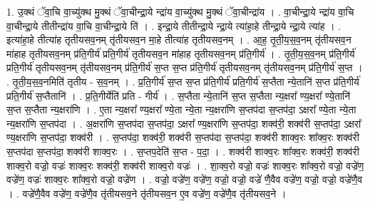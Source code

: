 \documentclass[17pt]{extarticle}
\begin{document}
1. उ॒क्थं ॅवा॒चि वा॒च्यु॑क्थ मु॒क्थं ॅवा॒चीन्द्रा॒ये न्द्रा॑य वा॒च्यु॑क्थ मु॒क्थं ॅवा॒चीन्द्रा॑य । . वा॒चीन्द्रा॒ये न्द्रा॑य वा॒चि वा॒चीन्द्रा॒ये तीतीन्द्रा॑य वा॒चि वा॒चीन्द्रा॒ये ति॑ । . इन्द्रा॒ये तीतीन्द्रा॒ये न्द्रा॒ये त्या॑हा॒हे तीन्द्रा॒ये न्द्रा॒ये त्या॑ह । . इत्या॑हा॒हे तीत्या॑ह तृतीयसव॒नम् तृ॑तीयसव॒न मा॒हे तीत्या॑ह तृतीयसव॒नम् । . आ॒ह॒ तृ॒ती॒य॒स॒व॒नम् तृ॑तीयसव॒न मा॑हाह तृतीयसव॒नम् प्र॑ति॒गीर्य॑ प्रति॒गीर्य॑ तृतीयसव॒न मा॑हाह तृतीयसव॒नम् प्र॑ति॒गीर्य॑ । . तृ॒ती॒य॒स॒व॒नम् प्र॑ति॒गीर्य॑ प्रति॒गीर्य॑ तृतीयसव॒नम् तृ॑तीयसव॒नम् प्र॑ति॒गीर्य॑ स॒प्त स॒प्त प्र॑ति॒गीर्य॑ तृतीयसव॒नम् तृ॑तीयसव॒नम् प्र॑ति॒गीर्य॑ स॒प्त । . तृ॒ती॒य॒स॒व॒नमिति॑ तृतीय - स॒व॒नम् । . प्र॒ति॒गीर्य॑ स॒प्त स॒प्त प्र॑ति॒गीर्य॑ प्रति॒गीर्य॑ स॒प्तैता न्ये॒तानि॑ स॒प्त प्र॑ति॒गीर्य॑ प्रति॒गीर्य॑ स॒प्तैतानि॑ । . प्र॒ति॒गीर्येति॑ प्रति - गीर्य॑ । . स॒प्तैता न्ये॒तानि॑ स॒प्त स॒प्तैता न्य॒क्षरा᳚ ण्य॒क्षरा᳚ ण्ये॒तानि॑ स॒प्त स॒प्तैता न्य॒क्षरा॑णि । . ए॒ता न्य॒क्षरा᳚ ण्य॒क्षरा᳚ ण्ये॒ता न्ये॒ता न्य॒क्षरा॑णि स॒प्तप॑दा 
स॒प्तप॑दा॒ ऽक्षरा᳚ ण्ये॒ता न्ये॒ता न्य॒क्षरा॑णि स॒प्तप॑दा । . अ॒क्षरा॑णि स॒प्तप॑दा स॒प्तप॑दा॒ ऽक्षरा᳚ ण्य॒क्षरा॑णि स॒प्तप॑दा॒ शक्व॑री॒ शक्व॑री 
स॒प्तप॑दा॒ ऽक्षरा᳚ ण्य॒क्षरा॑णि स॒प्तप॑दा॒ शक्व॑री । . स॒प्तप॑दा॒ शक्व॑री॒ शक्व॑री स॒प्तप॑दा स॒प्तप॑दा॒ शक्व॑री शाक्व॒रः शा᳚क्व॒रः शक्व॑री स॒प्तप॑दा स॒प्तप॑दा॒ शक्व॑री शाक्व॒रः । . स॒प्तप॒देति॑ स॒प्त - प॒दा॒ । . शक्व॑री शाक्व॒रः शा᳚क्व॒रः शक्व॑री॒ शक्व॑री शाक्व॒रो वज्रो॒ वज्रः॑ शाक्व॒रः शक्व॑री॒ शक्व॑री शाक्व॒रो वज्रः॑ । . शा॒क्व॒रो वज्रो॒ वज्रः॑ शाक्व॒रः शा᳚क्व॒रो वज्रो॒ वज्रे॑ण॒ वज्रे॑ण॒ वज्रः॑ शाक्व॒रः शा᳚क्व॒रो वज्रो॒ वज्रे॑ण । . वज्रो॒ वज्रे॑ण॒ वज्रे॑ण॒ वज्रो॒ वज्रो॒ वज्रे॑ णै॒वैव वज्रे॑ण॒ वज्रो॒ वज्रो॒ वज्रे॑णै॒व । . वज्रे॑णै॒वैव वज्रे॑ण॒ वज्रे॑णै॒व तृ॑तीयसव॒ने तृ॑तीयसव॒न ए॒व वज्रे॑ण॒ वज्रे॑णै॒व तृ॑तीयसव॒ने । \newline
\end{document}
